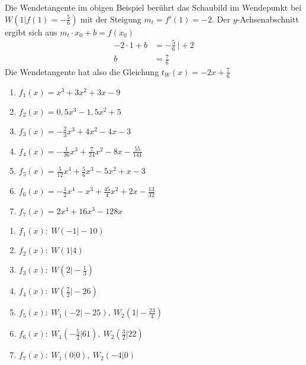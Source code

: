 Die Wendetangente im obigen Beispiel berührt das Schaubild im Wendepunkt bei \(W\left(1|f(1)=-\frac{5}{6}\right)\) mit der Steigung \(m_t=f'(1)=-2\). Der \(y\)-Achsenabschnitt ergibt sich aus \(m_t\cdot x_0+b=f(x_0)\)
\begin{align*}
    -2\cdot 1 + b &= -\frac{5}{6}\ \vert+2\\
    b&=\frac{7}{6}
\end{align*}
Die Wendetangente hat also die Gleichung \(t_W(x)=-2x+\frac{7}{6}\)
\newpage
\begin{Exercise}[title={\raggedright Bestimme die Wendepunkte.}, label=wendepunkteA1]
	\begin{enumerate}[label=\alph*)]
		\item \(f_1(x)=x^3+3x^2+3x-9\)
		\item \(f_2(x)=0,5x^3-1,5x^2+5\)
		\item \(f_3(x)=-\frac{2}{3}x^3+4x^2-4x-3\)
		\item \(f_4(x)=-\frac{1}{36}x^3+\frac{7}{24}x^2-8x-\frac{55}{144}\)
		\item \(f_5(x)=\frac{5}{12}x^4+\frac{5}{6}x^3-5x^2+x-3\)
		\item \(f_6(x)=-\frac{1}{2}x^4-x^3+\frac{45}{4}x^2+2x-\frac{13}{32}\)
		\item \(f_7(x)=2x^4+16x^3-128x\)
	\end{enumerate}
\end{Exercise}
\begin{Answer}[ref=wendepunkteA1]
	\begin{enumerate}[label=\alph*)]
		\item \(f_1(x):\ W\left(-1\vert -10\right)\)
		\item \(f_2(x):\ W\left(1\vert 4\right)\)
		\item \(f_3(x):\ W\left(2\vert -\frac{1}{3}\right)\)
		\item \(f_4(x):\ W\left(\frac{7}{2}\vert -26\right)\)
		\item \(f_5(x):\ W_1\left(-2\vert -25\right),\ W_2\left(1\vert -\frac{23}{4}\right)\)
		\item \(f_6(x):\ W_1\left(-\frac{5}{2}\vert 61\right),\ W_2\left(\frac{3}{2}\vert 22\right)\)
		\item \(f_7(x):\ W_1\left(0\vert 0\right),\ W_2\left(-4\vert 0\right)\)
	\end{enumerate}
\end{Answer}